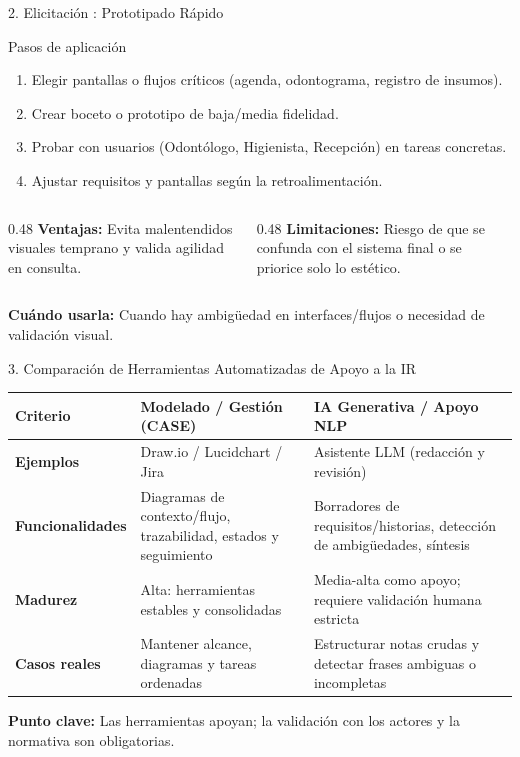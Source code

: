 \documentclass[aspectratio=169,10pt]{beamer}
\begin{document}
\begin{frame}{2. Elicitación : Prototipado Rápido}
  \begin{block}{Pasos de aplicación}
    \begin{enumerate}
      \item Elegir pantallas o flujos críticos (agenda, odontograma, registro de insumos).
      \item Crear boceto o prototipo de baja/media fidelidad.
      \item Probar con usuarios (Odontólogo, Higienista, Recepción) en tareas concretas.
      \item Ajustar requisitos y pantallas según la retroalimentación.
    \end{enumerate}
  \end{block}
  \begin{columns}[T]
    \begin{column}{0.48\textwidth}
      \textbf{Ventajas:} Evita malentendidos visuales temprano y valida agilidad en consulta.
    \end{column}
    \begin{column}{0.48\textwidth}
      \textbf{Limitaciones:} Riesgo de que se confunda con el sistema final o se priorice solo lo estético.
    \end{column}
  \end{columns}
  \vspace{0.2cm}
  \textbf{Cuándo usarla:} Cuando hay ambigüedad en interfaces/flujos o necesidad de validación visual.
\end{frame}

\begin{frame}{3. Comparación de Herramientas Automatizadas de Apoyo a la IR}
  \scriptsize
  \begin{tabular}{p{2.2cm} p{5.5cm} p{5.5cm}}
    \toprule
    \textbf{Criterio} & \textbf{Modelado / Gestión (CASE)} & \textbf{IA Generativa / Apoyo NLP} \\
    \midrule
    \textbf{Ejemplos} & Draw.io / Lucidchart / Jira & Asistente LLM (redacción y revisión) \\
    \textbf{Funcionalidades} & Diagramas de contexto/flujo, trazabilidad, estados y seguimiento & Borradores de requisitos/historias, detección de ambigüedades, síntesis \\
    \textbf{Madurez} & Alta: herramientas estables y consolidadas & Media-alta como apoyo; requiere validación humana estricta \\
    \textbf{Casos reales} & Mantener alcance, diagramas y tareas ordenadas & Estructurar notas crudas y detectar frases ambiguas o incompletas \\
    \bottomrule
  \end{tabular}
  \vspace{0.25cm}
  \textbf{Punto clave:} Las herramientas apoyan; la validación con los actores y la normativa son obligatorias.
\end{frame}
\end{document}
